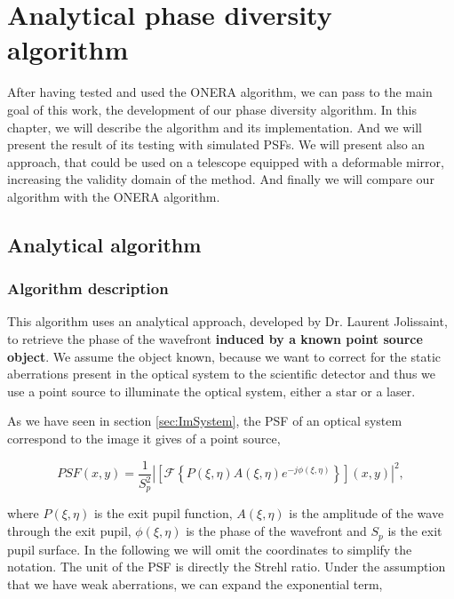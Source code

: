 \chapter{Analytical phase diversity algorithm} 
\label{ch:ourPD}

After having tested and used the ONERA algorithm, we can pass to the main goal of this work, the development of our phase diversity algorithm. In this chapter, we will describe the algorithm and its implementation. And we will present the result of its testing with simulated PSFs. We will present also an approach, that could be used on a telescope equipped with a deformable mirror, increasing the validity domain of the method. And finally we will compare our algorithm with the ONERA algorithm.

\section{Analytical algorithm}
\label{sec:AnAlgo}

\subsection{Algorithm description}
\label{subsec:ANalgoDesc}

This algorithm uses an analytical approach, developed by Dr. Laurent Jolissaint, to retrieve the phase of the wavefront \textbf{induced by a known point source object}. We assume the object known, because we want to correct for the static aberrations present in the optical system to the scientific detector and thus we use a point source to illuminate the optical system, either a star or a laser.

As we have seen in section \ref{sec:ImSystem}, the PSF of an optical system correspond to the image it gives of a point source,

\begin{equation}
PSF(x,y) = \frac{1}{S_p^2}|\left[\mathcal{F}\left\lbrace P(\xi,\eta)A(\xi,\eta)e^{-j\phi(\xi,\eta)} \right\rbrace\right](x,y)|^2,
\label{eqt:PSF}
\end{equation}

where $P(\xi,\eta)$ is the exit pupil function, $A(\xi,\eta)$ is the amplitude of the wave through the exit pupil, $\phi(\xi,\eta)$ is the phase of the wavefront and $S_p$ is the exit pupil surface. In the following we will omit the coordinates to simplify the notation. The unit of the PSF is directly the Strehl ratio. Under the assumption that we have weak aberrations, we can expand the exponential term,

